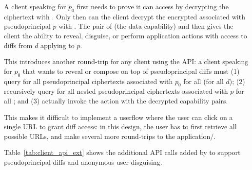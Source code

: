 A client speaking for $p_0$ first needs to prove it can access  by decrypting the 
ciphertext with . Only then can the client decrypt the encrypted  associated
with pseudoprincipal $p$ with . The pair of  (the data capability) and 
then gives the client the ability to reveal, disguise, or perform application actions with access to
diffs from $d$ applying to $p$.

This introduces another round-trip for any client using the API: a client speaking for $p_0$ that
wants to reveal or compose on top of pseudoprincipal diffs must (1) query for all pseudoprincipal
 ciphertexts associated with $p_0$ for all  (for all $d$); (2) recursively
query for all nested pseudoprincipal  ciphertexts associated with $p$ for all ;
and (3) actually invoke the action with the decrypted capability pairs.

This makes it difficult to implement a userflow where the user can click on a single URL to grant
\sys diff access: in this design, the user has to first retrieve all possible URLs, and make several
more round-trips to the application/\sys.

Table~\ref{tab:client_api_ext} shows the additional API calls added by \sys to support
pseudoprincipal diffs and anonymous user disguising. 


